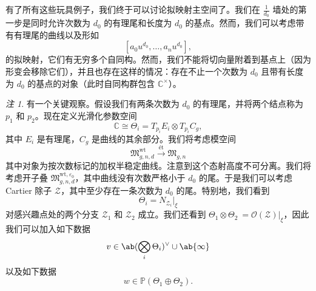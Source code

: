\documentclass{amsart}
\theoremstyle{definition}
\theoremstyle{remark}
\newtheorem{rmk}[thm]{注}
\theoremstyle{plain}
\theoremstyle{definition}
\theoremstyle{remark}
\newcommand{\C}{\mathbb{C}}
\renewcommand{\P}{\mathbb{P}}
\newcommand{\ep}{\varepsilon}
\newcommand{\mc}[1]{\mathcal{#1}}
\newcommand{\mf}[1]{\mathfrak{#1}}
\newcommand{\mr}[1]{\mathrm{#1}}
\newcommand{\1}{\mathbf{1}}
\newcommand{\2}{\mathbf{2}}
\newcommand{\3}{\mathbf{3}}
\begin{document}
有了所有这些玩具例子，我们终于可以讨论拟映射主空间了。我们在 \(\frac{1}{d_0}\) 墙处的第一步是同时允许次数为 \(d_0\) 的有理尾和长度为 \(d_0\) 的基点。然而，我们可以考虑带有有理尾的曲线以及形如
\[ [a_0 u^{d_0}, \ldots, a_n u^{d_0}], \]
的拟映射，它们有无穷多个自同构。然而，我们不能将切向量附着到基点上（因为形变会移除它们），并且也存在这样的情况：存在不止一个次数为 \(d_0\) 且带有长度为 \(d_0\) 的基点的对象（此时自同构群包含 \(\C^{\times}\)）。

\begin{rmk}
    有一个关键观察。假设我们有两条次数为 \(d_0\) 的有理尾，并将两个结点称为 \(p_1\) 和 \(p_2\)。现在定义光滑化参数空间
    \[ \C \cong \Theta_i = T_{p_i} E_i \otimes T_{p_i} C_g, \]
    其中 \(E_i\) 是有理尾，\(C_g\) 是曲线的其余部分。我们将考虑模空间
    \[ \mf{M}_{g,n,d}^{\mr{wt}} \xrightarrow{\text{\'et}} \mf{M}_{g,n} \]
    其中对象为按次数标记的加权半稳定曲线。注意到这个态射高度不可分离。我们将考虑开子叠 \(\mf{M}_{g,n,d}^{\mr{wt}, \ep_0}\)，其中曲线没有次数严格小于 \(d_0\) 的尾。于是我们可以考虑 Cartier 除子 \(\mc{Z}\)，其中至少存在一条次数为 \(d_0\) 的尾。特别地，我们看到
    \[ \Theta_i = N_{\mc{Z}_i} |_{\xi} \]
    对感兴趣点处的两个分支 \(\mc{Z}_1\) 和 \(\mc{Z}_2\) 成立。我们还看到 \(\Theta_1 \otimes \Theta_2\ = \mc{O}(\mc{Z})|_{\xi}\)，因此我们可以加入如下数据
    \[ v \in \ab(\bigotimes_i \Theta_i)^{\vee} \cup \ab\{\infty\} \]
    以及如下数据
    \[ w \in \P(\Theta_1 \oplus\Theta_2). \]
\end{rmk}
\end{document}
